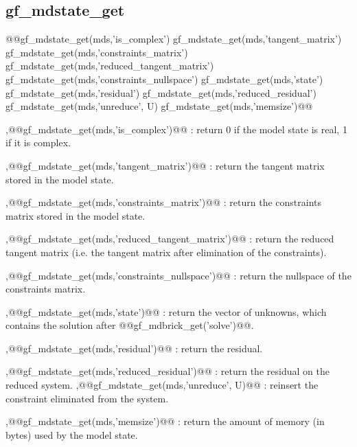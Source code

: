 \subsection{gf\_mdstate_get}
\begin{synopsis}
@@gf_mdstate_get(mds,'is_complex')
gf_mdstate_get(mds,'tangent_matrix')
gf_mdstate_get(mds,'constraints_matrix')
gf_mdstate_get(mds,'reduced_tangent_matrix')
gf_mdstate_get(mds,'constraints_nullspace')
gf_mdstate_get(mds,'state')
gf_mdstate_get(mds,'residual')
gf_mdstate_get(mds,'reduced_residual')
gf_mdstate_get(mds,'unreduce', \tvec U)
gf_mdstate_get(mds,'memsize')@@
\end{synopsis}
\begin{cmddescription}
\sep{@@gf_mdstate_get(mds,'is_complex')@@} :
return 0 if the model state is real, 1 if it is complex.

\sep{@@gf_mdstate_get(mds,'tangent_matrix')@@} :
return the tangent matrix stored in the model state.

\sep{@@gf_mdstate_get(mds,'constraints_matrix')@@} :
return the constraints matrix stored in the model state.

\sep{@@gf_mdstate_get(mds,'reduced_tangent_matrix')@@} : 
  return the reduced tangent matrix (i.e. the tangent matrix after
  elimination of the constraints). 

\sep{@@gf_mdstate_get(mds,'constraints_nullspace')@@} :
return the nullspace of the constraints matrix.

\sep{@@gf_mdstate_get(mds,'state')@@} :
return the vector of unknowns, which contains the solution after @@gf_mdbrick_get('solve')@@.

\sep{@@gf_mdstate_get(mds,'residual')@@} :
return the residual.

\sep{@@gf_mdstate_get(mds,'reduced_residual')@@} :
return the residual on the reduced system.
\sep{@@gf_mdstate_get(mds,'unreduce', U)@@} :
reinsert the constraint eliminated from the system.

\sep{@@gf_mdstate_get(mds,'memsize')@@} :
return the amount of memory (in bytes) used by the model state.
\end{cmddescription}
\newpage

